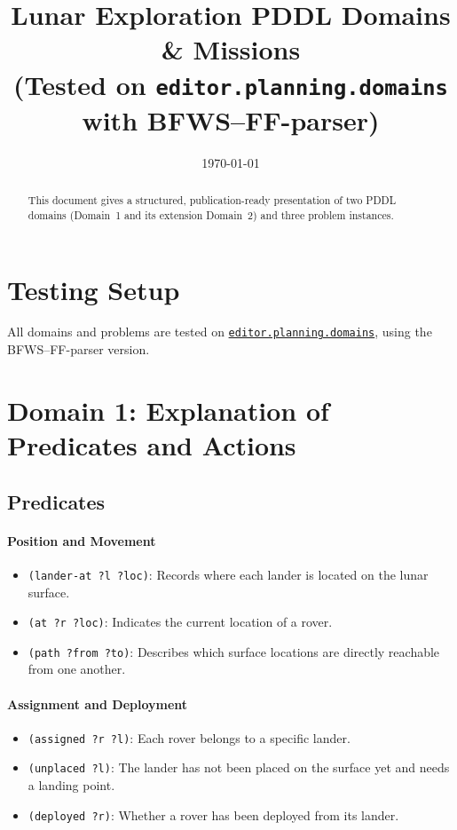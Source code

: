 \documentclass[11pt,a4paper]{article}
\title{\vspace{-8mm}\textbf{Lunar Exploration PDDL Domains \& Missions}\\
\large(Tested on \texttt{editor.planning.domains} with BFWS--FF-parser)\vspace{-3mm}}
\author{}
\date{\vspace{-6mm}\today}
\newcommand{\pred}[1]{\texttt{(#1)}}
\begin{document}
\maketitle

\begin{abstract}\noindent
This document gives a structured, publication-ready presentation of two PDDL domains (Domain~1 and its extension Domain~2) and three problem instances. 
\end{abstract}

\section{Testing Setup}
All domains and problems are tested on \href{https://editor.planning.domains}{\texttt{editor.planning.domains}}, using the BFWS--FF-parser version.

\section{Domain 1: Explanation of Predicates and Actions}

\subsection*{Predicates}

\paragraph{Position and Movement}
\begin{itemize}
  \item \pred{lander-at ?l ?loc}: Records where each lander is located on the lunar surface.
  \item \pred{at ?r ?loc}: Indicates the current location of a rover.
  \item \pred{path ?from ?to}: Describes which surface locations are directly reachable from one another.
\end{itemize}

\paragraph{Assignment and Deployment}
\begin{itemize}
  \item \pred{assigned ?r ?l}: Each rover belongs to a specific lander.
  \item \pred{unplaced ?l}: The lander has not been placed on the surface yet and needs a landing point.
  \item \pred{deployed ?r}: Whether a rover has been deployed from its lander.
\end{itemize}
\end{document}
